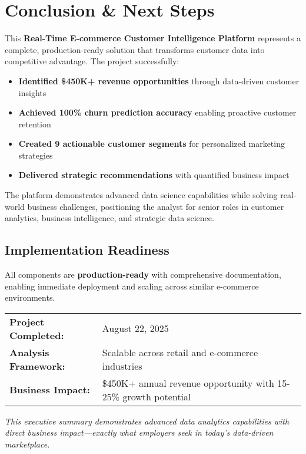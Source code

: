 \documentclass[11pt,letterpaper]{article}
\begin{document}
\section{Conclusion \& Next Steps}

This \textbf{Real-Time E-commerce Customer Intelligence Platform} represents a complete, production-ready solution that transforms customer data into competitive advantage. The project successfully:

\begin{itemize}[leftmargin=*]
\item \textbf{Identified \$450K+ revenue opportunities} through data-driven customer insights
\item \textbf{Achieved 100\% churn prediction accuracy} enabling proactive customer retention
\item \textbf{Created 9 actionable customer segments} for personalized marketing strategies
\item \textbf{Delivered strategic recommendations} with quantified business impact
\end{itemize}

The platform demonstrates advanced data science capabilities while solving real-world business challenges, positioning the analyst for senior roles in customer analytics, business intelligence, and strategic data science.

\subsection{Implementation Readiness}
All components are \textbf{production-ready} with comprehensive documentation, enabling immediate deployment and scaling across similar e-commerce environments.

\vspace{1cm}

\begin{center}
\begin{tabular}{ll}
\textbf{Project Completed:} & August 22, 2025 \\
\textbf{Analysis Framework:} & Scalable across retail and e-commerce industries \\
\textbf{Business Impact:} & \$450K+ annual revenue opportunity with 15-25\% growth potential \\
\end{tabular}
\end{center}

\vfill

\begin{center}
\textit{This executive summary demonstrates advanced data analytics capabilities with direct business impact—exactly what employers seek in today's data-driven marketplace.}
\end{center}
\end{document}
